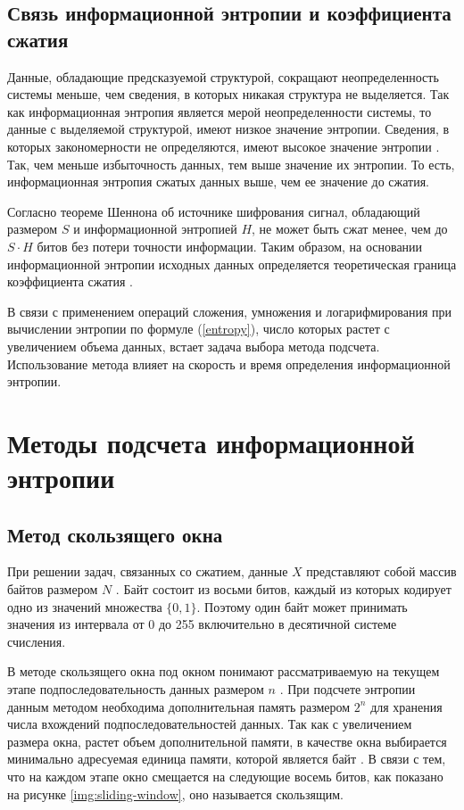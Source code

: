 \subsection{Связь информационной энтропии и коэффициента сжатия}

Данные, обладающие предсказуемой структурой, сокращают неопределенность системы меньше, чем сведения, в которых никакая структура не выделяется. Так как информационная энтропия является мерой неопределенности системы, то данные с выделяемой структурой, имеют низкое значение энтропии. Сведения, в которых закономерности не определяются, имеют высокое значение энтропии \cite{relation}. Так, чем меньше избыточность данных, тем выше значение их энтропии. То есть, информационная энтропия сжатых данных выше, чем ее значение до сжатия.

Согласно теореме Шеннона об источнике шифрования сигнал, обладающий размером $S$ и информационной энтропией $H$, не может быть сжат менее, чем до $S \cdot H$ битов без потери точности информации. Таким образом, на основании информационной энтропии исходных данных определяется теоретическая граница коэффициента сжатия \cite{theorem}.

В связи с применением операций сложения, умножения и логарифмирования при вычислении энтропии по формуле (\ref{entropy}), число которых растет с увеличением объема данных, встает задача выбора метода подсчета. Использование метода влияет на скорость и время определения информационной энтропии.

\section{Методы подсчета информационной энтропии}

\subsection{Метод скользящего окна}

При решении задач, связанных со сжатием, данные $X$ представляют собой массив байтов размером $N$ \cite{bytes}. Байт состоит из восьми битов, каждый из которых кодирует одно из значений множества $\{0, 1\}$. Поэтому один байт может принимать значения из интервала от 0 до 255 включительно в десятичной системе счисления. 

В методе скользящего окна под окном понимают рассматриваемую на текущем этапе подпоследовательность данных размером $n$ \cite{sliding-window-method}. При подсчете энтропии данным методом необходима дополнительная память размером $2^n$ для хранения числа вхождений подпоследовательностей данных. Так как с увеличением размера окна, растет объем дополнительной памяти, в качестве окна выбирается минимально адресуемая единица памяти, которой является байт \cite{memory-unit}. В связи с тем, что на каждом этапе окно смещается на следующие восемь битов, как показано на рисунке \ref{img:sliding-window}, оно называется скользящим.

